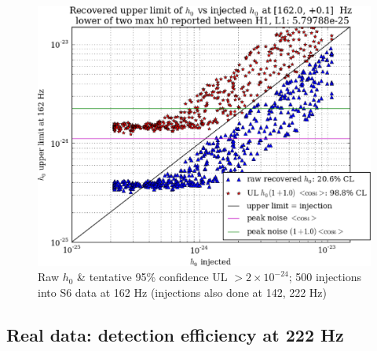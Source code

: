 \begin{figure}
\begin{center}
\includegraphics[width=0.5\paperwidth,height=0.35\paperheight]{plots/h0UL-vs-h0injected-162-0Hz.eps}
\caption{
Raw $h_0$ \& tentative 95\% confidence UL $>2\times10^{-24}$; 500 injections
into S6 data at 162 Hz (injections also done at 142, 222 Hz)}
\end{center}
\end{figure}




\subsection{Real data: detection efficiency at 222 Hz}

